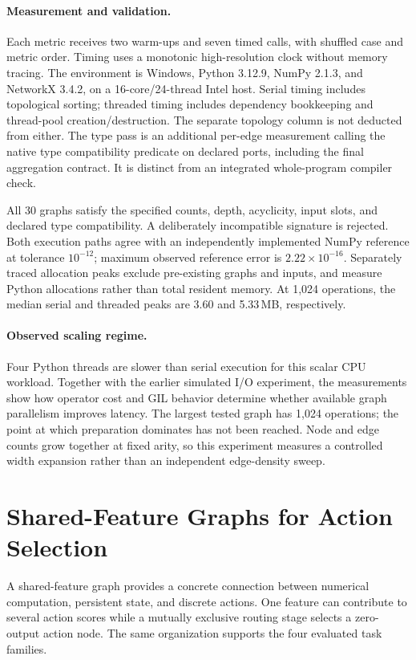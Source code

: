 \paragraph{Measurement and validation.}
Each metric receives two warm-ups and seven timed calls, with shuffled case and
metric order. Timing uses a monotonic high-resolution clock without memory
tracing. The environment is Windows, Python 3.12.9, NumPy 2.1.3, and NetworkX
3.4.2, on a 16-core/24-thread Intel host. Serial timing includes topological
sorting; threaded timing includes dependency bookkeeping and thread-pool
creation/destruction. The separate topology column is not deducted from either.
The type pass is an additional per-edge measurement calling the native type
compatibility predicate on declared ports, including the final aggregation
contract. It is distinct from an integrated whole-program compiler check.

All 30 graphs satisfy the specified counts, depth, acyclicity, input slots, and
declared type compatibility. A deliberately incompatible signature is rejected.
Both execution paths agree with an independently implemented NumPy reference
at tolerance $10^{-12}$; maximum observed reference error is
$2.22\times10^{-16}$. Separately traced allocation peaks exclude pre-existing
graphs and inputs, and measure Python allocations rather than total resident
memory. At 1,024 operations, the median serial and threaded peaks are 3.60 and
5.33\,MB, respectively.

\paragraph{Observed scaling regime.}
Four Python threads are slower than serial execution for this scalar CPU
workload. Together with the earlier simulated I/O experiment, the measurements
show how operator cost and GIL behavior determine whether available graph
parallelism improves latency. The largest tested graph has 1,024 operations;
the point at which preparation dominates has not been reached. Node and edge
counts grow together at fixed arity, so this experiment measures a controlled
width expansion rather than an independent edge-density sweep.

\section{Shared-Feature Graphs for Action Selection}
\label{app:revision_action}

A shared-feature graph provides a concrete connection between numerical
computation, persistent state, and discrete actions. One feature can contribute
to several action scores while a mutually exclusive routing stage selects a
zero-output action node. The same organization supports the four evaluated
task families.

